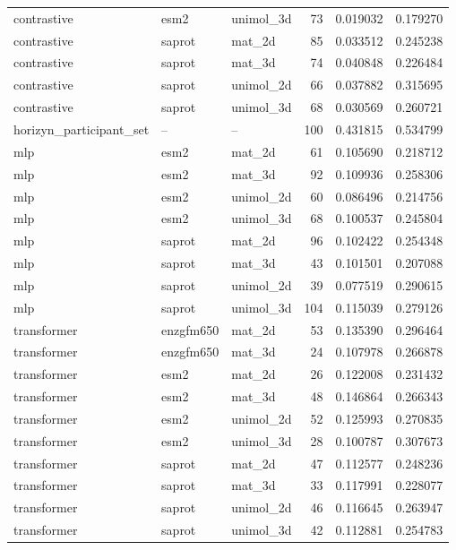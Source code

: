 \begin{longtable}{p{.32\linewidth}llrrr}
contrastive & esm2 & unimol\_3d & 73 & 0.019032 & 0.179270 \\
contrastive & saprot & mat\_2d & 85 & 0.033512 & 0.245238 \\
contrastive & saprot & mat\_3d & 74 & 0.040848 & 0.226484 \\
contrastive & saprot & unimol\_2d & 66 & 0.037882 & 0.315695 \\
contrastive & saprot & unimol\_3d & 68 & 0.030569 & 0.260721 \\
horizyn\_participant\_set & -- & -- & 100 & 0.431815 & 0.534799 \\
mlp & esm2 & mat\_2d & 61 & 0.105690 & 0.218712 \\
mlp & esm2 & mat\_3d & 92 & 0.109936 & 0.258306 \\
mlp & esm2 & unimol\_2d & 60 & 0.086496 & 0.214756 \\
mlp & esm2 & unimol\_3d & 68 & 0.100537 & 0.245804 \\
mlp & saprot & mat\_2d & 96 & 0.102422 & 0.254348 \\
mlp & saprot & mat\_3d & 43 & 0.101501 & 0.207088 \\
mlp & saprot & unimol\_2d & 39 & 0.077519 & 0.290615 \\
mlp & saprot & unimol\_3d & 104 & 0.115039 & 0.279126 \\
transformer & enzgfm650 & mat\_2d & 53 & 0.135390 & 0.296464 \\
transformer & enzgfm650 & mat\_3d & 24 & 0.107978 & 0.266878 \\
transformer & esm2 & mat\_2d & 26 & 0.122008 & 0.231432 \\
transformer & esm2 & mat\_3d & 48 & 0.146864 & 0.266343 \\
transformer & esm2 & unimol\_2d & 52 & 0.125993 & 0.270835 \\
transformer & esm2 & unimol\_3d & 28 & 0.100787 & 0.307673 \\
transformer & saprot & mat\_2d & 47 & 0.112577 & 0.248236 \\
transformer & saprot & mat\_3d & 33 & 0.117991 & 0.228077 \\
transformer & saprot & unimol\_2d & 46 & 0.116645 & 0.263947 \\
transformer & saprot & unimol\_3d & 42 & 0.112881 & 0.254783 \\
\end{longtable}
